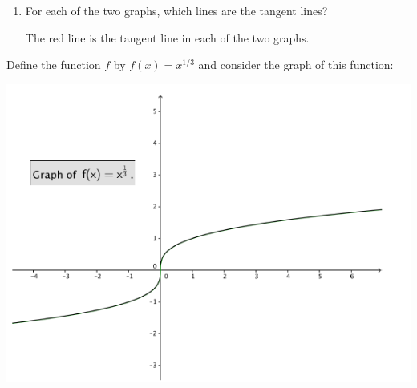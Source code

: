 \documentclass[nooutcomes]{ximera}
\begin{document}
\begin{problem}
\begin{enumerate}
    \item 
      For each of the two graphs, which lines are the tangent lines?
      \begin{freeResponse}
        The red line is the tangent line in each of the two graphs.        
      \end{freeResponse}

  \end{enumerate}
\end{problem}


	
\begin{problem}
  Define the function $f$ by $f(x) = x^{1/3}$ and consider the graph of this function:
  \begin{image}
    \includegraphics[scale = 0.5]{figure1.png}
  \end{image}


\end{problem}
\end{document}
